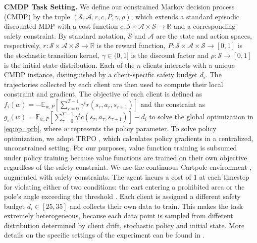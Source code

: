 \documentclass{article} %
\begin{document}
\textbf{CMDP Task Setting.} We define our constrained Markov decision process (CMDP) by the tuple $(\mathcal{S},\mathcal{A},r,c,P,\gamma,\rho)$, which extends a standard episodic discounted MDP with a cost function $c:\mathcal{S}\times\mathcal{A}\times\mathcal{S}\rightarrow\mathbb{R}$ and a corresponding safety constraint. By standard notation, $\mathcal{S}$ and $\mathcal{A}$ are the state and action spaces, respectively, $r:\mathcal{S}\times\mathcal{A}\times\mathcal{S}\rightarrow\mathbb{R}$ is the reward function, $P:\mathcal{S}\times\mathcal{A}\times\mathcal{S}\rightarrow[0,1]$ is the stochastic transition kernel, $\gamma\in(0,1]$ is the discount factor and $\rho:\mathcal{S}\rightarrow[0,1]$ is the initial state distribution. Each of the $n$ clients interacts with a unique CMDP instance, distinguished by a client-specific safety budget $d_i$. The trajectories collected by each client are then used to compute their local constraint and gradient. The objective of each client is defined as $f_i(w)=-\mathbb{E}_{w,P}\left[\sum_{\tau=0}^{T-1}\gamma^t r(s_\tau,a_\tau,s_{\tau+1})\right]$ and the constraint as $g_i(w)=\mathbb{E}_{w,P}\left[\sum_{\tau=0}^{T-1}\gamma^t c(s_\tau,a_\tau,s_{\tau+1})\right]-d_i$ to solve the global optimization in \ref{eq:op_prb}, where $w$ represents the policy parameter. 
To solve policy optimization, we adopt TRPO \citep{schulman2015trust}, which calculates policy gradients in a centralized, unconstrained setting. For our purposes, value function training is subsumed under policy training because value functions are trained on their own objective regardless of the safety constraint. We use the continuous Cartpole environment \citep{brockman2016openaigym, towers2024gymnasium}, augmented with safety constraints. The agent incurs a cost of 1 at each timestep for violating either of two conditions: the cart entering a prohibited area or the pole's angle exceeding the threshold \citep{xu2021crpo}. Each client is assigned a different safety budget $d_i\in[25,35]$ and collects their own data to train. This makes the task extremely heterogeneous, because each data point is sampled from different distribution determined by client drift, stochastic policy and initial state. More details on the specific settings of the experiment can be found in .
\end{document}
